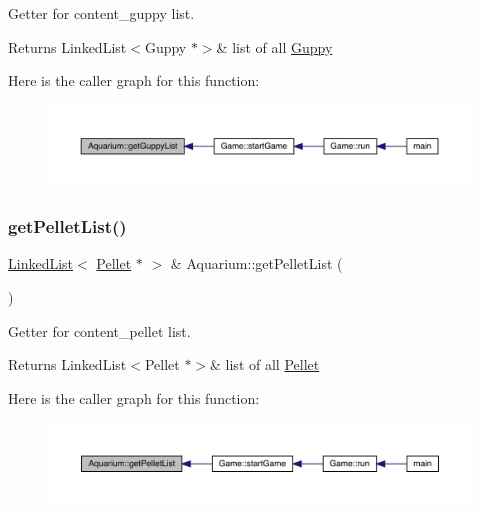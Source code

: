 Getter for content\+\_\+guppy list. 

\begin{DoxyReturn}{Returns}
Linked\+List$<$\+Guppy $\ast$$>$\& list of all \mbox{\hyperlink{class_guppy}{Guppy}} 
\end{DoxyReturn}
Here is the caller graph for this function\+:\nopagebreak
\begin{figure}[H]
\begin{center}
\leavevmode
\includegraphics[width=350pt]{class_aquarium_a3244b33f404c2887f04342754f17f4ee_icgraph}
\end{center}
\end{figure}
\mbox{\label{class_aquarium_a2d0eeed1f5776e13f0bbafc6844ce7a2}} 
\subsubsection{\texorpdfstring{get\+Pellet\+List()}{getPelletList()}}
{\footnotesize\ttfamily \mbox{\hyperlink{class_linked_list}{Linked\+List}}$<$ \mbox{\hyperlink{class_pellet}{Pellet}} $\ast$ $>$ \& Aquarium\+::get\+Pellet\+List (\begin{DoxyParamCaption}{ }\end{DoxyParamCaption})}



Getter for content\+\_\+pellet list. 

\begin{DoxyReturn}{Returns}
Linked\+List$<$\+Pellet $\ast$$>$\& list of all \mbox{\hyperlink{class_pellet}{Pellet}} 
\end{DoxyReturn}
Here is the caller graph for this function\+:\nopagebreak
\begin{figure}[H]
\begin{center}
\leavevmode
\includegraphics[width=350pt]{class_aquarium_a2d0eeed1f5776e13f0bbafc6844ce7a2_icgraph}
\end{center}
\end{figure}
\mbox{\label{class_aquarium_a46c1697b25884c5a91f7a942ae5b3ba7}} 
